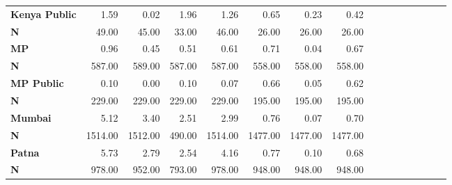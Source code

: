\begin{tabular}{@{\extracolsep{5pt}}lrrrrrrrrrrrrrrr}
{\bf Kenya Public} & 1.59\phantom{***} & 0.02\phantom{***} & 1.96\phantom{***} & 1.26\phantom{***} & 0.65\phantom{***} & 0.23\phantom{***} & 0.42\phantom{***} \\
{\bf N} & 49.00\phantom{***} & 45.00\phantom{***} & 33.00\phantom{***} & 46.00\phantom{***} & 26.00\phantom{***} & 26.00\phantom{***} & 26.00\phantom{***} \\
{\bf MP} & 0.96\phantom{***} & 0.45\phantom{***} & 0.51\phantom{***} & 0.61\phantom{***} & 0.71\phantom{***} & 0.04\phantom{***} & 0.67\phantom{***} \\
{\bf N} & 587.00\phantom{***} & 589.00\phantom{***} & 587.00\phantom{***} & 587.00\phantom{***} & 558.00\phantom{***} & 558.00\phantom{***} & 558.00\phantom{***} \\
{\bf MP Public} & 0.10\phantom{***} & 0.00\phantom{***} & 0.10\phantom{***} & 0.07\phantom{***} & 0.66\phantom{***} & 0.05\phantom{***} & 0.62\phantom{***} \\
{\bf N} & 229.00\phantom{***} & 229.00\phantom{***} & 229.00\phantom{***} & 229.00\phantom{***} & 195.00\phantom{***} & 195.00\phantom{***} & 195.00\phantom{***} \\
{\bf Mumbai} & 5.12\phantom{***} & 3.40\phantom{***} & 2.51\phantom{***} & 2.99\phantom{***} & 0.76\phantom{***} & 0.07\phantom{***} & 0.70\phantom{***} \\
{\bf N} & 1514.00\phantom{***} & 1512.00\phantom{***} & 490.00\phantom{***} & 1514.00\phantom{***} & 1477.00\phantom{***} & 1477.00\phantom{***} & 1477.00\phantom{***} \\
{\bf Patna} & 5.73\phantom{***} & 2.79\phantom{***} & 2.54\phantom{***} & 4.16\phantom{***} & 0.77\phantom{***} & 0.10\phantom{***} & 0.68\phantom{***} \\
{\bf N} & 978.00\phantom{***} & 952.00\phantom{***} & 793.00\phantom{***} & 978.00\phantom{***} & 948.00\phantom{***} & 948.00\phantom{***} & 948.00\phantom{***} \\
\hline
\end{tabular}
